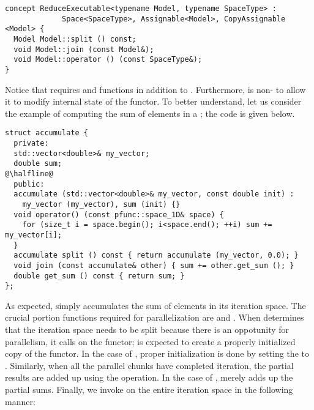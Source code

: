 \begin{center}
\begin{minipage}{0.8\textwidth}
\begin{lstlisting}
concept ReduceExecutable<typename Model, typename SpaceType> : 
             Space<SpaceType>, Assignable<Model>, CopyAssignable <Model> {
  Model Model::split () const;
  void Model::join (const Model&);
  void Model::operator () (const SpaceType&);
}
\end{lstlisting}
\end{minipage}
\end{center}
%
Notice that  requires  and  
functions in addition to .
%
Furthermore,  is non- to allow it to modify 
internal state of the functor.
%
To better understand, let us consider the example of computing the sum of 
elements in a ; the code is given below.
%
\begin{center}
\begin{minipage}{0.7\textwidth}
\begin{lstlisting}
struct accumulate {
  private:
  std::vector<double>& my_vector;
  double sum;
@\halfline@
  public:
  accumulate (std::vector<double>& my_vector, const double init) :
    my_vector (my_vector), sum (init) {}
  void operator() (const pfunc::space_1D& space) {
    for (size_t i = space.begin(); i<space.end(); ++i) sum += my_vector[i];
  }
  accumulate split () const { return accumulate (my_vector, 0.0); }
  void join (const accumulate& other) { sum += other.get_sum (); }
  double get_sum () const { return sum; }
};
\end{lstlisting}
\end{minipage}
\end{center}
%
As expected,  simply accumulates the sum of elements in its 
iteration space.
%
The crucial portion functions required for parallelization are  
and .
%
When  determines that the iteration space needs 
to be split because there is an oppotunity for parallelism, it calls
 on the functor;  is expected to create a properly 
initialized copy of the functor.
%
In the case of , proper initialization is done by setting the 
 to .
%
Similarly, when all the parallel chunks have completed iteration, the partial 
results are added up using the  operation.
%
In the case of ,  merely adds up the partial 
sums. 
%
Finally, we invoke  on the entire iteration space
in the following manner:

